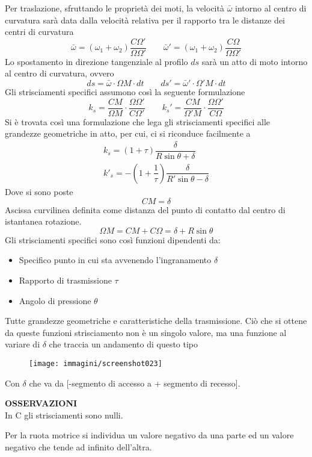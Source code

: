 \documentclass[a4paper, 15pt]{article}
\begin{document}
\begin{adjustwidth}{2in}{}
	Per traslazione, sfruttando le proprietà dei moti, la velocità $\bar{\omega}$ intorno al centro di curvatura sarà data dalla velocità relativa per il rapporto tra le distanze dei centri di curvatura
	\[\bar{\omega} = (\omega_1 + \omega_2)\dfrac{C\Omega'}{\Omega\Omega'} \qquad \bar{\omega}' = (\omega_1 + \omega_2)\dfrac{C\Omega}{\Omega\Omega'}\]
	Lo spostamento in direzione tangenziale al profilo $ds$ sarà un atto di moto intorno al centro di curvatura, ovvero 
	\[ds = \bar{\omega}\cdot\Omega M\cdot dt \qquad ds' = \bar{\omega}'\cdot\Omega' M\cdot dt \]
	Gli strisciamenti specifici assumono così la seguente formulazione 
	\[k_s = \dfrac{CM}{\Omega M} \cdot \dfrac{\Omega\Omega'}{C\Omega'} \qquad k_s' = \dfrac{CM}{\Omega' M} \cdot \dfrac{\Omega\Omega'}{C\Omega}\]
	Si è trovata così una formulazione che lega gli strisciamenti specifici alle grandezze geometriche in atto, per cui, ci si riconduce facilmente a 
	\begin{eqnarray}
		k_s = (1+\tau)\dfrac{\delta}{R\sin\theta +\delta} \\
		k'_s = -\left(1+\dfrac{1}{\tau}\right)\dfrac{\delta}{R'\sin\theta -\delta}
	\end{eqnarray}
	Dove si sono poste 
	\[CM = \delta\]
	Ascissa curvilinea definita come distanza del punto di contatto dal centro di istantanea rotazione.
	\[\Omega M = CM + C\Omega = \delta + R\sin\theta\]
	Gli strisciamenti specifici sono così funzioni dipendenti da:
	\begin{itemize}
		\item Specifico punto in cui sta avvenendo l'ingranamento $\delta$ 
		\item Rapporto di trasmissione $\tau$
		\item Angolo di pressione $\theta$
	\end{itemize} 
	Tutte grandezze geometriche e caratteristiche della trasmissione. 
\newpage	
	Ciò che si ottene da queste funzioni strisciamento non è un singolo valore, ma una funzione al variare di $\delta$ che traccia un andamento di questo tipo
	\begin{figure}[H]
		\centering
		\texttt{[image: immagini/screenshot023]}
		\label{fig:screenshot023}
	\end{figure}
	Con $\delta$ che va da [-segmento di accesso a + segmento di recesso]. 
	
	\textbf{OSSERVAZIONI} \\
	In C gli strisciamenti sono nulli. 
	
	Per la ruota motrice si individua un valore negativo da una parte ed un valore negativo che tende ad infinito dell'altra. 
	

\end{adjustwidth}
\end{document}
